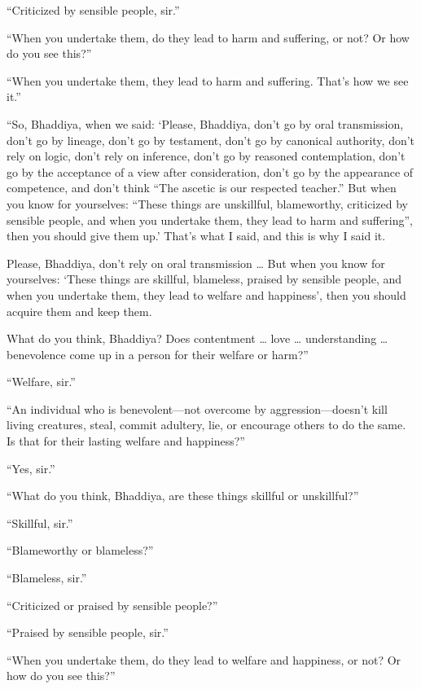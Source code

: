 \documentclass[12pt,openany]{book}%
\begin{document}
“Criticized by sensible people, sir.” 

“When you undertake them, do they lead to harm and suffering, or not? Or how do you see this?” 

“When you undertake them, they lead to harm and suffering. That’s how we see it.” 

“So, Bhaddiya, when we said: ‘Please, Bhaddiya, don’t go by oral transmission, don’t go by lineage, don’t go by testament, don’t go by canonical authority, don’t rely on logic, don’t rely on inference, don’t go by reasoned contemplation, don’t go by the acceptance of a view after consideration, don’t go by the appearance of competence, and don’t think “The ascetic is our respected teacher.” But when you know for yourselves: “These things are unskillful, blameworthy, criticized by sensible people, and when you undertake them, they lead to harm and suffering”, then you should give them up.’ That’s what I said, and this is why I said it. 

Please, Bhaddiya, don’t rely on oral transmission … But when you know for yourselves: ‘These things are skillful, blameless, praised by sensible people, and when you undertake them, they lead to welfare and happiness’, then you should acquire them and keep them. 

What do you think, Bhaddiya? Does contentment … love … understanding … benevolence come up in a person for their welfare or harm?” 

“Welfare, sir.” 

“An individual who is benevolent—not overcome by aggression—doesn’t kill living creatures, steal, commit adultery, lie, or encourage others to do the same. Is that for their lasting welfare and happiness?” 

“Yes, sir.” 

“What do you think, Bhaddiya, are these things skillful or unskillful?” 

“Skillful, sir.” 

“Blameworthy or blameless?” 

“Blameless, sir.” 

“Criticized or praised by sensible people?” 

“Praised by sensible people, sir.” 

“When you undertake them, do they lead to welfare and happiness, or not? Or how do you see this?” 
\end{document}
